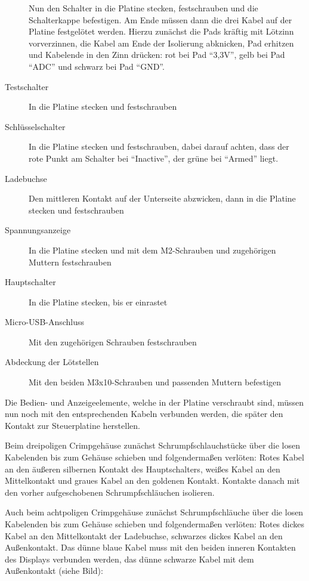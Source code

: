\documentclass[paper=a4, open=any]{scrbook}
\begin{document}
\begin{description}
						Nun den Schalter in die Platine stecken, festschrauben und die Schalterkappe befestigen. Am Ende müssen dann die drei Kabel auf der Platine festgelötet werden. Hierzu zunächst die Pads kräftig mit Lötzinn vorverzinnen, die Kabel am Ende der Isolierung abknicken, Pad erhitzen und Kabelende in den Zinn drücken: rot bei Pad \enquote{3,3V}, gelb bei Pad \enquote{ADC} und schwarz bei Pad \enquote{GND}.
						\item [Testschalter] In die Platine stecken und festschrauben
						\item [Schlüsselschalter] In die Platine stecken und festschrauben, dabei darauf achten, dass der rote Punkt am Schalter bei \enquote{Inactive}, der grüne bei \enquote{Armed} liegt.
						\item [Ladebuchse] Den mittleren Kontakt auf der Unterseite abzwicken, dann in die Platine stecken und festschrauben
						\item [Spannungsanzeige] In die Platine stecken und mit dem M2-Schrauben und zugehörigen Muttern festschrauben
						\item [Hauptschalter] In die Platine stecken, bis er einrastet
						\item [Micro-USB-Anschluss] Mit den zugehörigen Schrauben festschrauben
						\item [Abdeckung der Lötstellen] Mit den beiden M3x10-Schrauben und passenden Muttern befestigen
					\end{description}

					Die Bedien- und Anzeigeelemente, welche in der Platine verschraubt sind, müssen nun noch mit den entsprechenden Kabeln verbunden werden, die später den Kontakt zur Steuerplatine herstellen.

					Beim dreipoligen Crimpgehäuse zunächst Schrumpfschlauchstücke über die losen Kabelenden bis zum Gehäuse schieben und folgendermaßen verlöten: Rotes Kabel an den äußeren silbernen Kontakt des Hauptschalters, weißes Kabel an den Mittelkontakt und graues Kabel an den goldenen Kontakt. Kontakte danach mit den vorher aufgeschobenen Schrumpfschläuchen isolieren.

					Auch beim achtpoligen Crimpgehäuse zunächst Schrumpfschläuche über die losen Kabelenden bis zum Gehäuse schieben und folgendermaßen verlöten: Rotes dickes Kabel an den Mittelkontakt der Ladebuchse, schwarzes dickes Kabel an den Außenkontakt. Das dünne blaue Kabel muss mit den beiden inneren Kontakten des Displays verbunden werden, das dünne schwarze Kabel mit dem Außenkontakt (siehe Bild):
					
\end{document}
